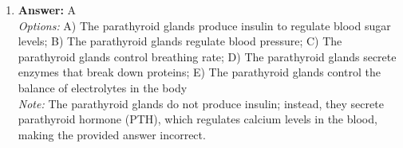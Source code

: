\documentclass[12pt]{article}
\begin{document}
\begin{enumerate}[label=\arabic*.]
\\ \textit{Note:} Crossing-over during meiosis facilitates genetic recombination, which increases genetic diversity and allows scientists to assess mutation rates by analyzing the frequency and distribution of alleles in offspring.
\item \textbf{Answer:} A
\\ \textit{Options:} A) The parathyroid glands produce insulin to regulate blood sugar levels; B) The parathyroid glands regulate blood pressure; C) The parathyroid glands control breathing rate; D) The parathyroid glands secrete enzymes that break down proteins; E) The parathyroid glands control the balance of electrolytes in the body
\\ \textit{Note:} The parathyroid glands do not produce insulin; instead, they secrete parathyroid hormone (PTH), which regulates calcium levels in the blood, making the provided answer incorrect.
\end{enumerate}
\end{document}

